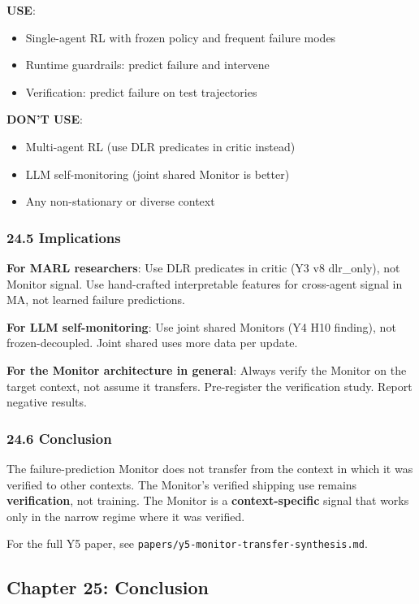 \documentclass[11pt]{article}
\begin{document}
\textbf{USE}:
\begin{itemize}
  \item Single-agent RL with frozen policy and frequent failure modes
  \item Runtime guardrails: predict failure and intervene
  \item Verification: predict failure on test trajectories
\end{itemize}


\textbf{DON'T USE}:
\begin{itemize}
  \item Multi-agent RL (use DLR predicates in critic instead)
  \item LLM self-monitoring (joint shared Monitor is better)
  \item Any non-stationary or diverse context
\end{itemize}


\subsubsection{24.5 Implications}

\textbf{For MARL researchers}: Use DLR predicates in critic (Y3
v8 dlr\_only), not Monitor signal. Use hand-crafted
interpretable features for cross-agent signal in MA, not
learned failure predictions.

\textbf{For LLM self-monitoring}: Use joint shared Monitors (Y4 H10
finding), not frozen-decoupled. Joint shared uses more data per
update.

\textbf{For the Monitor architecture in general}: Always verify
the Monitor on the target context, not assume it transfers.
Pre-register the verification study. Report negative results.

\subsubsection{24.6 Conclusion}

The failure-prediction Monitor does not transfer from the
context in which it was verified to other contexts. The
Monitor's verified shipping use remains \textbf{verification}, not
training. The Monitor is a \textbf{context-specific} signal that
works only in the narrow regime where it was verified.

For the full Y5 paper, see \texttt{papers/y5-monitor-transfer-synthesis.md}.

\hrulefill

\subsection{Chapter 25: Conclusion}
\end{document}
